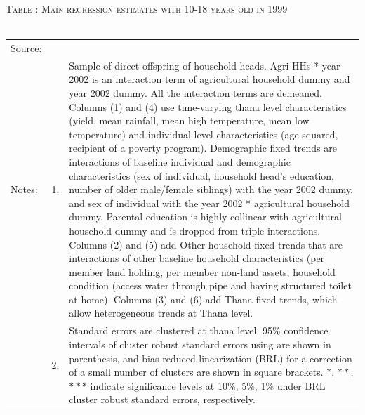 \documentclass[12pt,letterpaper]{article}
\newcommand{\0}{\ensuremath{\mbox{\boldmath $0$}}}
\begin{document}
\begin{table}
\hfil\textsc{\footnotesize Table \thetable: Main regression estimates with 10-18 years old in 1999 \\
\label{base10}}\\
\setlength{\tabcolsep}{1pt}
\renewcommand{\arraystretch}{.75}
\hfil
\renewcommand{\arraystretch}{1}
\hfil\begin{tabular}{>{\hfill\scriptsize}p{1cm}<{}>{\hfill\scriptsize}p{.5cm}<{}>{\scriptsize}p{13cm}<{\hfill}}
Source:& \multicolumn{2}{l}{\scriptsize Compiled from IFPRI data. }\\[-1ex]
Notes:& 1. & Sample of direct offspring of household heads. \textsf{Agri HHs * year 2002} is an interaction term of agricultural household dummy and year 2002 dummy. All the interaction terms are demeaned. Columns \textsf{(1) and (4)} use time-varying thana level characteristics (yield, mean rainfall, mean high temperature, mean low temperature) and individual level characteristics (age squared, recipient of a poverty program). \textsf{Demographic fixed trends} are interactions of baseline individual and demographic characteristics (sex of individual, household head's education, number of older male/female siblings) with the year 2002 dummy, and sex of individual with the year 2002 * agricultural household dummy. Parental education is highly collinear with agricultural household dummy and is dropped from triple interactions. Columns \textsf{(2) and (5)} add \textsf{Other household fixed trends} that are interactions of other baseline household characteristics (per member land holding, per member non-land assets, household condition (access water through pipe and having structured toilet at home). Columns \textsf{(3) and (6)} add \textsf{Thana fixed trends}, which allow heterogeneous trends at Thana level. \\[-1ex]
& 2. & Standard errors are clustered at thana level. 95\% confidence intervals of cluster robust standard errors using \cite{liang1986longitudinal} are shown in parenthesis, and bias-reduced linearization (BRL) for a correction of a small number of clusters are shown in square brackets. $*$, $**$, $***$ indicate significance levels at 10\%, 5\%, 1\% under BRL cluster robust standard errors, respectively.
\end{tabular}
\end{table}
\end{document}

